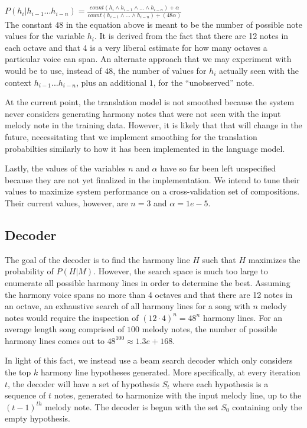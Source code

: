\documentclass{sig-alternate}
\begin{document}
$P(h_{i} | h_{i - 1} ... h_{i - n}) = \frac{count(h_{i} \wedge h_{i - 1} \wedge ... \wedge h_{i - n}) + \alpha}{count(h_{i - 1} \wedge ... \wedge h_{i - n}) + (48\alpha)}$\\

The constant $48$ in the equation above is meant to be the number of possible note values for the variable $h_{i}$. It is derived from the fact that there are 12 notes in each octave and that 4 is a very liberal estimate for how many octaves a particular voice can span. An alternate approach that we may experiment with would be to use, instead of $48$, the number of values for $h_{i}$ actually seen with the context $h_{i -1} ... h_{i - n}$, plus an additional $1$, for the ``unobserved'' note.

At the current point, the translation model is not smoothed because the system never considers generating harmony notes that were not seen with the input melody note in the training data. However, it is likely that that will change in the future, necessitating that we implement smoothing for the translation probabilties similarly to how it has been implemented in the language model. 

Lastly, the values of the variables $n$ and $\alpha$ have so far been left unspecified because they are not yet finalized in the implementation. We intend to tune their values to maximize system performance on a cross-validation set of compositions. Their current values, however, are $n = 3$ and $\alpha = 1e-5$.

\subsection {Decoder}
The goal of the decoder is to find the harmony line $H$ such that $H$ maximizes the probability of $P(H | M)$. However, the search space is much too large to enumerate all possible harmony lines in order to determine the best. Assuming the harmony voice spans no more than 4 octaves and that there are 12 notes in an octave, an exhaustive search of all harmony lines for a song with $n$ melody notes would require the inspection of $(12\cdot 4)^{n} = 48^{n}$ harmony lines. For an average length song comprised of $100$ melody notes, the number of possible harmony lines comes out to $48^{100} \approx 1.3e+168$. 

In light of this fact, we instead use a beam search decoder which only considers the top $k$ harmony line hypotheses generated. More specifically, at every iteration $t$, the decoder will have a set of hypothesis $S_{t}$ where each hypothesis is a sequence of $t$ notes, generated to harmonize with the input melody line, up to the $(t - 1)^{th}$ melody note. The decoder is begun with the set $S_{0}$ containing only the empty hypothesis. 
\end{document}
